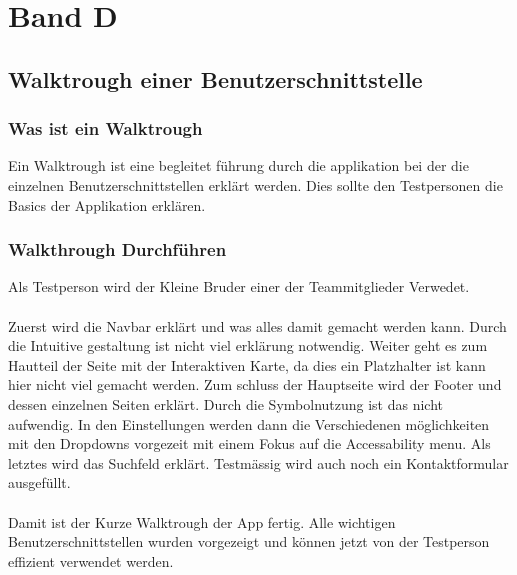 \documentclass[10pt]{article}
\begin{document}
	\pagebreak
	
	\section{Band D}
	\subsection {Walktrough einer Benutzerschnittstelle}
	\subsubsection{Was ist ein Walktrough}
	Ein Walktrough ist eine begleitet führung durch die applikation bei der die einzelnen Benutzerschnittstellen erklärt werden. Dies sollte den Testpersonen die Basics der Applikation erklären.
	\subsubsection{Walkthrough Durchführen}
	Als Testperson wird der Kleine Bruder einer der Teammitglieder Verwedet.\\\\
	Zuerst wird die Navbar erklärt und was alles damit gemacht werden kann. Durch die Intuitive gestaltung ist nicht viel erklärung notwendig. Weiter geht es zum Hautteil der Seite mit der Interaktiven Karte, da dies ein Platzhalter ist kann hier nicht viel gemacht werden. Zum schluss der Hauptseite wird der Footer und dessen einzelnen Seiten erklärt. Durch die Symbolnutzung ist das nicht aufwendig. In den Einstellungen werden dann die Verschiedenen möglichkeiten mit den Dropdowns vorgezeit mit einem Fokus auf die Accessability menu. Als letztes wird das Suchfeld erklärt. Testmässig wird auch noch ein Kontaktformular ausgefüllt.\\\\
	Damit ist der Kurze Walktrough der App fertig. Alle wichtigen Benutzerschnittstellen wurden vorgezeigt und können jetzt von der Testperson effizient verwendet werden.
\end{document}
